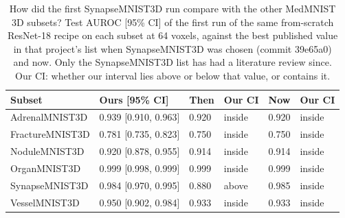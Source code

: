 \begin{table}[t]
\caption{How did the first SynapseMNIST3D run compare with the other MedMNIST 3D subsets? Test AUROC [95\% CI] of the first run of the same from-scratch ResNet-18 recipe on each subset at 64 voxels, against the best published value in that project's list when SynapseMNIST3D was chosen (commit 39e65a0) and now. Only the SynapseMNIST3D list has had a literature review since. Our CI: whether our interval lies above or below that value, or contains it.}
\label{tab:subsets}
\centering
\footnotesize
\setlength{\tabcolsep}{3pt}
\begin{tabular}{@{}llllll@{}}
\toprule
Subset & Ours [95\% CI] & Then & Our CI & Now & Our CI \\
\midrule
AdrenalMNIST3D & 0.939 [0.910, 0.963] & 0.920 & inside & 0.920 & inside \\
FractureMNIST3D & 0.781 [0.735, 0.823] & 0.750 & inside & 0.750 & inside \\
NoduleMNIST3D & 0.920 [0.878, 0.955] & 0.914 & inside & 0.914 & inside \\
OrganMNIST3D & 0.999 [0.998, 0.999] & 0.999 & inside & 0.999 & inside \\
SynapseMNIST3D & 0.984 [0.970, 0.995] & 0.880 & above & 0.985 & inside \\
VesselMNIST3D & 0.950 [0.902, 0.984] & 0.933 & inside & 0.933 & inside \\
\bottomrule
\end{tabular}
\end{table}
